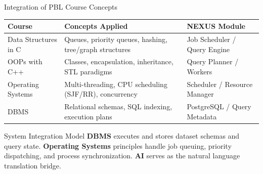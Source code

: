 \documentclass[aspectratio=169,11pt]{beamer}
\begin{document}
\begin{frame}{Integration of PBL Course Concepts}

\begin{center}
\renewcommand{\arraystretch}{1.1}
\fontsize{6.5}{8}\selectfont
\begin{tabularx}{\textwidth}{@{}p{2.3cm}X p{2.5cm}@{}}
\toprule
\textbf{Course} & \textbf{Concepts Applied} & \textbf{NEXUS Module} \\
\midrule
Data Structures in C & Queues, priority queues, hashing, tree/graph structures & Job Scheduler / Query Engine \\
OOPs with C++ & Classes, encapsulation, inheritance, STL paradigms & Query Planner / Workers \\
Operating Systems & Multi-threading, CPU scheduling (SJF/RR), concurrency & Scheduler / Resource Manager \\
DBMS & Relational schemas, SQL indexing, execution plans & PostgreSQL / Query Metadata \\
\bottomrule
\end{tabularx}
\end{center}

\vspace{1mm}

\begin{block}{System Integration Model}
\scriptsize
\textbf{DBMS} executes and stores dataset schemas and query state. \textbf{Operating Systems} principles handle job queuing, priority dispatching, and process synchronization. \textbf{AI} serves as the natural language translation bridge.
\end{block}

\end{frame}


\end{document}
